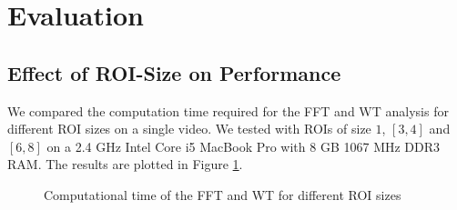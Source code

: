 \documentclass[11pt]{scrartcl}
\begin{document}

\section{Evaluation}

\subsection{Effect of ROI-Size on Performance}
\label{sec:effect-roi-size}

We compared the computation time required for the FFT and WT analysis for different ROI sizes on a single video. We tested with ROIs of size $1$, $[3, 4]$ and $[6, 8]$ on a 2.4 GHz Intel Core i5 MacBook Pro with 8 GB 1067 MHz DDR3 RAM. The results are plotted in Figure \ref{fig:computational-time}.

\speed
\begin{figure}[ht]
  \begin{minipage}{0.3\linewidth}
    \centering
    \pgfplotstabletypeset[columns={FFT,WT}]\speed
    
  \end{minipage}
  \begin{minipage}{0.4\linewidth}
    \centering
  \end{minipage}
  \caption{Computational time of the FFT and WT for different ROI sizes}
  \label{fig:computational-time}
\end{figure}
\end{document}
